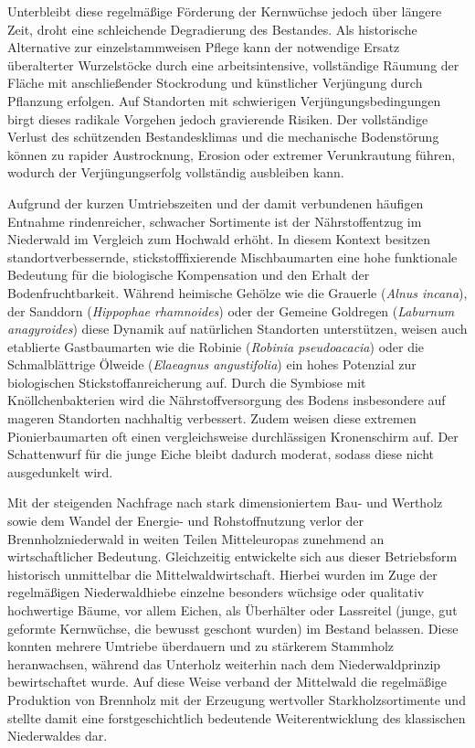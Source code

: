 \documentclass[twocolumn, bibliography=totoc, abstract=true]{scrartcl}
\begin{document}
Unterbleibt diese regelmäßige Förderung der Kernwüchse jedoch über längere Zeit, droht eine schleichende Degradierung des Bestandes. Als historische Alternative zur einzelstammweisen Pflege kann der notwendige Ersatz überalterter Wurzelstöcke durch eine arbeitsintensive, vollständige Räumung der Fläche mit anschließender Stockrodung und künstlicher Verjüngung durch Pflanzung erfolgen. Auf Standorten mit schwierigen Verjüngungsbedingungen birgt dieses radikale Vorgehen jedoch gravierende Risiken. Der vollständige Verlust des schützenden Bestandesklimas und die mechanische Bodenstörung können zu rapider Austrocknung, Erosion oder extremer Verunkrautung führen, wodurch der Verjüngungserfolg vollständig ausbleiben kann.

Aufgrund der kurzen Umtriebszeiten und der damit verbundenen häufigen Entnahme rindenreicher, schwacher Sortimente ist der Nährstoffentzug im Niederwald im Vergleich zum Hochwald erhöht. In diesem Kontext besitzen standortverbessernde, stickstofffixierende Mischbaumarten eine hohe funktionale Bedeutung für die biologische Kompensation und den Erhalt der Bodenfruchtbarkeit. Während heimische Gehölze wie die Grauerle (\textit{Alnus incana}), der Sanddorn (\textit{Hippophae rhamnoides}) oder der Gemeine Goldregen (\textit{Laburnum anagyroides}) diese Dynamik auf natürlichen Standorten unterstützen, weisen auch etablierte Gastbaumarten wie die Robinie (\textit{Robinia pseudoacacia}) oder die Schmalblättrige Ölweide (\textit{Elaeagnus angustifolia}) ein hohes Potenzial zur biologischen Stickstoffanreicherung auf. Durch die Symbiose mit Knöllchenbakterien wird die Nährstoffversorgung des Bodens insbesondere auf mageren Standorten nachhaltig verbessert. Zudem weisen diese extremen Pionierbaumarten oft einen vergleichsweise durchlässigen Kronenschirm auf. Der Schattenwurf für die junge Eiche bleibt dadurch moderat, sodass diese nicht ausgedunkelt wird.

Mit der steigenden Nachfrage nach stark dimensioniertem Bau- und Wertholz sowie dem Wandel der Energie- und Rohstoffnutzung verlor der Brennholzniederwald in weiten Teilen Mitteleuropas zunehmend an wirtschaftlicher Bedeutung. Gleichzeitig entwickelte sich aus dieser Betriebsform historisch unmittelbar die Mittelwaldwirtschaft. Hierbei wurden im Zuge der regelmäßigen Niederwaldhiebe einzelne besonders wüchsige oder qualitativ hochwertige Bäume, vor allem Eichen, als Überhälter oder Lassreitel (junge, gut geformte Kernwüchse, die bewusst geschont wurden) im Bestand belassen. Diese konnten mehrere Umtriebe überdauern und zu stärkerem Stammholz heranwachsen, während das Unterholz weiterhin nach dem Niederwaldprinzip bewirtschaftet wurde. Auf diese Weise verband der Mittelwald die regelmäßige Produktion von Brennholz mit der Erzeugung wertvoller Starkholzsortimente und stellte damit eine forstgeschichtlich bedeutende Weiterentwicklung des klassischen Niederwaldes dar.
\end{document}
